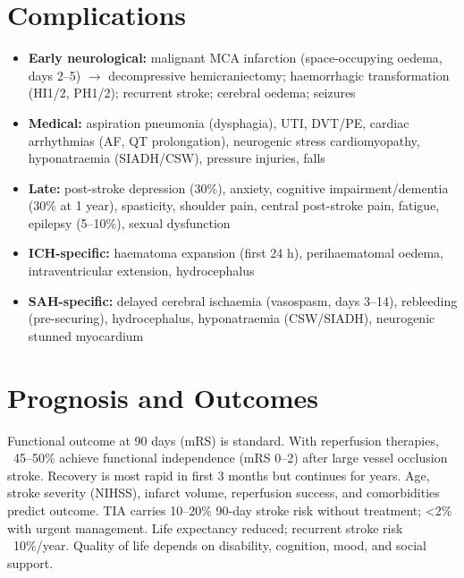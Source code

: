 \section*{Complications}
\begin{itemize}
    \item \textbf{Early neurological:} malignant MCA infarction (space-occupying oedema, days 2--5) $\to$ decompressive hemicraniectomy; haemorrhagic transformation (HI1/2, PH1/2); recurrent stroke; cerebral oedema; seizures
    \item \textbf{Medical:} aspiration pneumonia (dysphagia), UTI, DVT/PE, cardiac arrhythmias (AF, QT prolongation), neurogenic stress cardiomyopathy, hyponatraemia (SIADH/CSW), pressure injuries, falls
    \item \textbf{Late:} post-stroke depression (30\%), anxiety, cognitive impairment/dementia (30\% at 1 year), spasticity, shoulder pain, central post-stroke pain, fatigue, epilepsy (5--10\%), sexual dysfunction
    \item \textbf{ICH-specific:} haematoma expansion (first 24 h), perihaematomal oedema, intraventricular extension, hydrocephalus
    \item \textbf{SAH-specific:} delayed cerebral ischaemia (vasospasm, days 3--14), rebleeding (pre-securing), hydrocephalus, hyponatraemia (CSW/SIADH), neurogenic stunned myocardium
\end{itemize}

\section*{Prognosis and Outcomes}
Functional outcome at 90 days (mRS) is standard. With reperfusion therapies, ~45--50\% achieve functional independence (mRS 0--2) after large vessel occlusion stroke. Recovery is most rapid in first 3 months but continues for years. Age, stroke severity (NIHSS), infarct volume, reperfusion success, and comorbidities predict outcome. TIA carries 10--20\% 90-day stroke risk without treatment; <2\% with urgent management. Life expectancy reduced; recurrent stroke risk ~10\%/year. Quality of life depends on disability, cognition, mood, and social support.

